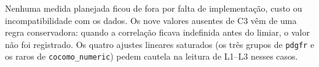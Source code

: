 \documentclass[10pt,a4paper]{article}
\begin{document}
Nenhuma medida planejada ficou de fora por falta de implementação, custo ou incompatibilidade com os dados. Os nove valores ausentes de C3 vêm de uma regra conservadora: quando a correlação ficava indefinida antes do limiar, o valor não foi registrado. Os quatro ajustes lineares saturados (os três grupos de \texttt{pdgfr} e os raros de \texttt{cocomo\_numeric}) pedem cautela na leitura de L1--L3 nesses casos.
\end{document}
